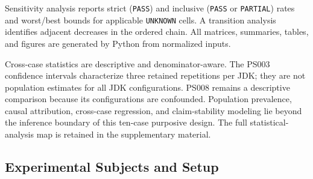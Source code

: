 \documentclass[a4paper,fleqn]{cas-dc}
\begin{document}
Sensitivity analysis reports strict (\texttt{PASS}) and inclusive (\texttt{PASS} or \texttt{PARTIAL}) rates and worst/best bounds for applicable \texttt{UNKNOWN} cells. A transition analysis identifies adjacent decreases in the ordered chain. All matrices, summaries, tables, and figures are generated by Python from normalized inputs.

Cross-case statistics are descriptive and denominator-aware. The PS003 confidence intervals characterize three retained repetitions per JDK; they are not population estimates for all JDK configurations. PS008 remains a descriptive comparison because its configurations are confounded. Population prevalence, causal attribution, cross-case regression, and claim-stability modeling lie beyond the inference boundary of this ten-case purposive design. The full statistical-analysis map is retained in the supplementary material.

\subsection{Experimental Subjects and Setup}
\end{document}
